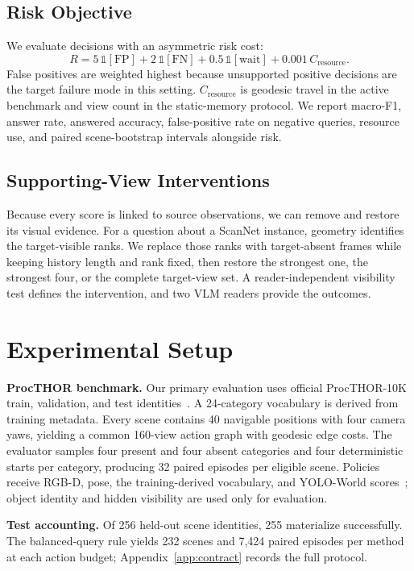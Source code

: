 \documentclass{article}
\begin{document}
\subsection{Risk Objective}
We evaluate decisions with an asymmetric risk cost:
\begin{equation}
  R = 5\,\mathbb{1}[\mathrm{FP}] + 2\,\mathbb{1}[\mathrm{FN}] + 0.5\,\mathbb{1}[\mathrm{wait}] + 0.001\,C_\mathrm{resource}.
\end{equation}
False positives are weighted highest because unsupported positive decisions are the target failure mode in this setting. $C_\mathrm{resource}$ is geodesic travel in the active benchmark and view count in the static-memory protocol. We report macro-F1, answer rate, answered accuracy, false-positive rate on negative queries, resource use, and paired scene-bootstrap intervals alongside risk.

\subsection{Supporting-View Interventions}
Because every score is linked to source observations, we can remove and restore its visual evidence. For a question about a ScanNet instance, geometry identifies the target-visible ranks. We replace those ranks with target-absent frames while keeping history length and rank fixed, then restore the strongest one, the strongest four, or the complete target-view set. A reader-independent visibility test defines the intervention, and two VLM readers provide the outcomes. 


\section{Experimental Setup}
\textbf{ProcTHOR benchmark.}
Our primary evaluation uses official ProcTHOR-10K train, validation, and test identities~\citep{deitke2022procthor}. A 24-category vocabulary is derived from training metadata. Every scene contains 40 navigable positions with four camera yaws, yielding a common 160-view action graph with geodesic edge costs. The evaluator samples four present and four absent categories and four deterministic starts per category, producing 32 paired episodes per eligible scene. Policies receive RGB-D, pose, the training-derived vocabulary, and YOLO-World scores~\citep{cheng2024yoloworld}; object identity and hidden visibility are used only for evaluation.

\textbf{Test accounting.}
Of 256 held-out scene identities, 255 materialize successfully. The balanced-query rule yields 232 scenes and 7,424 paired episodes per method at each action budget; Appendix~\ref{app:contract} records the full protocol.
\end{document}

